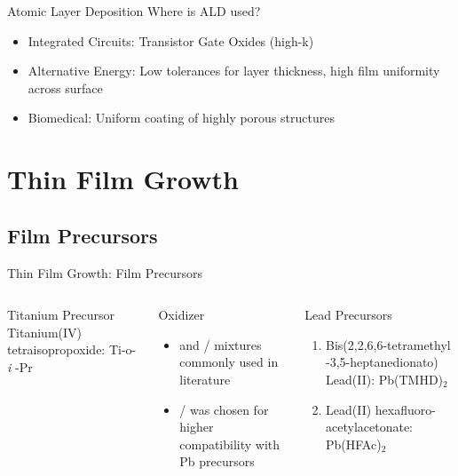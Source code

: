 \documentclass[professionalfont]{beamer}
\begin{document}
\begin{frame}{Atomic Layer Deposition}
	Where is ALD used?\vspace{1.5em}
	\begin{itemize}%
		\item Integrated Circuits: Transistor Gate Oxides (high-k)\vspace{1.5em}
		\item Alternative Energy: Low tolerances for layer thickness, high film uniformity across surface
		\vspace{1.5em}
		\item Biomedical: Uniform coating of highly porous structures
	\end{itemize}
\end{frame}


\section{Thin Film Growth}

\subsection{Film Precursors}
\begin{frame}{Thin Film Growth: Film Precursors}
	\begin{columns}[c]
			\begin{block}{Titanium Precursor}
				Titanium(IV) tetraisopropoxide: {Ti-o-\emph{i} -Pr}
			\end{block}
			\vspace{0.5em}
			\begin{block}{Oxidizer}
				\begin{itemize}
					\item {} and / mixtures commonly used in literature
					\item {}/ was chosen for higher compatibility with Pb precursors
				\end{itemize}
			\end{block}
			\begin{block}{Lead Precursors}
				\begin{enumerate}
					\item Bis(2,2,6,6-tetramethyl -3,5-heptanedionato) Lead(II): Pb(TMHD)$_{2}$
					\item Lead(II) hexafluoro- acetylacetonate: Pb(HFAc)$_{2}$
				\end{enumerate}
			\end{block}
	\end{columns}
\end{frame}
\end{document}
